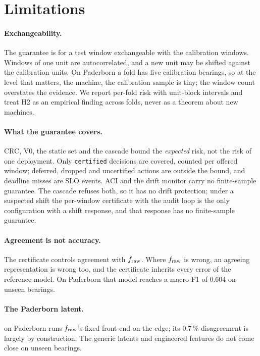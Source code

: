 \section{Limitations}
\label{sec:limitations}

\paragraph{Exchangeability.} The guarantee is for a test window exchangeable with the calibration
windows. Windows of one unit are autocorrelated, and a new unit may be shifted against the
calibration units. On Paderborn a fold has five calibration bearings, so at the level that matters,
the machine, the calibration sample is tiny; the window count overstates the evidence. We report
per-fold risk with unit-block intervals and treat H2 as an empirical finding across folds, never
as a theorem about new machines.

\paragraph{What the guarantee covers.} CRC, V0, the static set and the cascade bound the
\emph{expected} risk, not the risk of one deployment. Only \texttt{certified} decisions are covered,
counted per offered window; deferred, dropped and uncertified actions are outside the bound, and
deadline misses are SLO events. ACI and the drift monitor carry no finite-sample guarantee. The
cascade refuses both, so it has no drift protection; under a suspected shift the per-window
certificate with the audit loop is the only configuration with a shift response, and that response
has no finite-sample guarantee.

\paragraph{Agreement is not accuracy.} The certificate controls agreement with $f_{\mathrm{raw}}$. Where
$f_{\mathrm{raw}}$ is wrong, an agreeing representation is wrong too, and the certificate inherits every
error of the reference model. On Paderborn that model reaches a macro-F1 of 0.604 on unseen
bearings.

\paragraph{The Paderborn latent.}  on Paderborn runs $f_{\mathrm{raw}}$'s fixed front-end on the edge;
its 0.7\,\% disagreement is largely by construction. The generic latents and engineered features do
not come close on unseen bearings.

